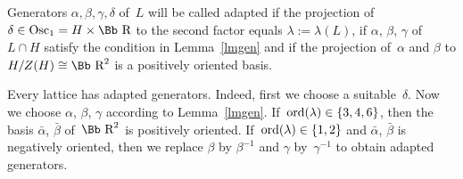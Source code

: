 \documentclass[10pt,a4paper]{amsart}
\newcommand\RR{{\mbox{\Bb R}}}
\newcommand{\Osc}{{\rm Osc}}
\newcommand{\ord}{{\rm ord}}
\numberwithin{equation}{section}
\begin{document}
\begin{Definition}\label{def:adapted}
Generators $\alpha,\beta,\gamma,\delta$ of~$L$ will be called adapted if
the projection of~$\delta\in \Osc_1=H\times \RR$ to the second factor equals $\lambda:=\lambda(L)$,
if $\alpha$, $\beta$, $\gamma$ of~$L\cap H$ satisfy the condition in Lemma~\ref{lmgen} and
if the projection of~$\alpha$ and $\beta$ to $H/Z(H)\cong\RR^2$ is a positively oriented basis.
\end{Definition}

Every lattice has adapted generators. Indeed, first we choose a suitable~$\delta$. Now we choose $\alpha$, $\beta$, $\gamma$ according to Lemma~\ref{lmgen}. If~$\ord(\lambda)\in\{3,4,6\}$, then the basis $\bar \alpha$, $\bar\beta$ of~$\RR^2$ is positively oriented. If~$\ord(\lambda)\in\{1,2\}$ and $\bar \alpha$, $\bar \beta$ is negatively oriented, then we replace $\beta$ by $\beta^{-1}$ and $\gamma$ by~$\gamma^{-1}$ to obtain adapted generators.
\end{document}
